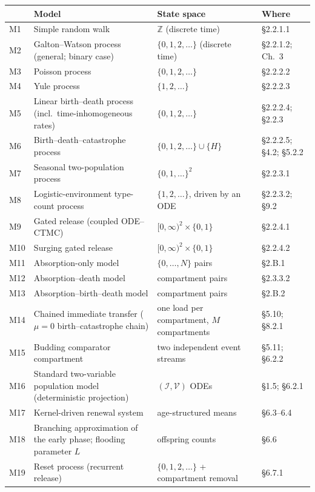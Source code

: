 \documentclass[11pt,a4paper]{report}
\newcommand{\Act}{\mathcal{I}}     %
\newcommand{\Free}{\mathcal{V}}    %
\begin{document}
{\small
\begin{longtable}{@{}p{}p{}p{}p{}@{}}
\toprule
& Model & State space & Where \\
\midrule
\endhead
M1 & Simple random walk & $\mathbb{Z}$ (discrete time) & \S2.2.1.1 \\
M2 & Galton--Watson process (general; binary case) & $\{0,1,2,\ldots\}$ (discrete time) & \S2.2.1.2; Ch.~3 \\
M3 & Poisson process & $\{0,1,2,\ldots\}$ & \S2.2.2.2 \\
M4 & Yule process & $\{1,2,\ldots\}$ & \S2.2.2.3 \\
M5 & Linear birth--death process (incl.\ time-inhomogeneous rates) & $\{0,1,2,\ldots\}$ & \S2.2.2.4; \S2.2.3 \\
M6 & Birth--death--catastrophe process & $\{0,1,2,\ldots\}\cup\{H\}$ & \S2.2.2.5; \S4.2; \S5.2.2 \\
M7 & Seasonal two-population process & $\{0,1,\ldots\}^2$ & \S2.2.3.1 \\
M8 & Logistic-environment type-count process & $\{1,2,\ldots\}$, driven by an ODE & \S2.2.3.2; \S9.2 \\
M9 & Gated release (coupled ODE--CTMC) & $[0,\infty)^2\times\{0,1\}$ & \S2.2.4.1 \\
M10 & Surging gated release & $[0,\infty)^2\times\{0,1\}$ & \S2.2.4.2 \\
M11 & Absorption-only model & $\{0,\ldots,N\}$ pairs & \S2.B.1 \\
M12 & Absorption--death model & compartment pairs & \S2.3.3.2 \\
M13 & Absorption--birth--death model & compartment pairs & \S2.B.2 \\
M14 & Chained immediate transfer ($\mu=0$ birth--catastrophe chain) & one load per compartment, $M$ compartments & \S5.10; \S8.2.1 \\
M15 & Budding comparator compartment & two independent event streams & \S5.11; \S6.2.2 \\
M16 & Standard two-variable population model (deterministic projection) & $(\Act,\Free)$ ODEs & \S1.5; \S6.2.1 \\
M17 & Kernel-driven renewal system & age-structured means & \S6.3--6.4 \\
M18 & Branching approximation of the early phase; flooding parameter $L$ & offspring counts & \S6.6 \\
M19 & Reset process (recurrent release) & $\{0,1,2,\ldots\}$ + compartment removal & \S6.7.1 \\

\end{longtable}}
\end{document}
